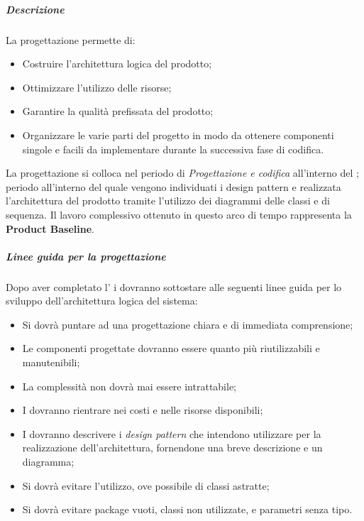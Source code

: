 	\subparagraph{Descrizione}
	La progettazione permette di:
	\begin{itemize}
		\item Costruire l'architettura logica del prodotto;
		\item Ottimizzare l'utilizzo delle risorse;
		\item Garantire la qualità prefissata del prodotto;
		\item Organizzare le varie parti del progetto in modo da ottenere componenti singole e facili da implementare durante la successiva fase di codifica.
	\end{itemize}
	
	La progettazione si colloca nel periodo di \emph{Progettazione e codifica} all'interno del \PdP{}; periodo all'interno del quale vengono individuati i design pattern e realizzata l'architettura del prodotto tramite l'utilizzo dei diagrammi delle classi e di sequenza. Il lavoro complessivo ottenuto in questo arco di tempo rappresenta la \textbf{Product Baseline}.


	\subparagraph{Linee guida per la progettazione}
	Dopo aver completato l'\AdR{} i \progs{} dovranno sottostare alle seguenti linee guida per lo sviluppo dell'architettura logica del sistema:
	\begin{itemize}
		\item Si dovrà puntare ad una progettazione chiara e di immediata comprensione;
		\item Le componenti progettate dovranno essere quanto più riutilizzabili e manutenibili;
		\item La complessità non dovrà mai essere intrattabile;
		\item I \progs{} dovranno rientrare nei costi e nelle risorse disponibili;
		\item I \progs{} dovranno descrivere i \emph{design pattern} che intendono utilizzare per la realizzazione dell'architettura, fornendone una breve descrizione e un diagramma;
		\item Si dovrà evitare l'utilizzo, ove possibile di classi astratte;
		\item Si dovrà evitare package vuoti, classi non utilizzate, e parametri senza tipo.
	\end{itemize}

